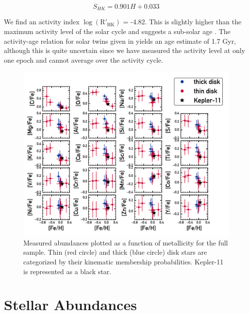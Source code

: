 \documentclass[twocolumn,trackchanges]{aastex61}
\begin{document}
\begin{equation}
S_{HK} = 0.901 H + 0.033
\end{equation}

We find an activity index $\log(\mathrm{R'_{HK}})$ = -4.82. This is slightly higher than the maximum activity level of the solar cycle and suggests a sub-solar age \citep{Skumanich1972}. The activity-age relation for solar twins given in \citet{Freitas2016} yields an age estimate of 1.7 Gyr, although this is quite uncertain since we have measured the activity level at only one epoch and cannot average over the activity cycle.

\begin{figure}
\centering
\includegraphics[scale=0.7]{xh}
\caption{Measured abundances plotted as a function of metallicity for the full sample. Thin (red circle) and thick (blue circle) disk stars are categorized by their kinematic membership probabilities. Kepler-11 is represented as a black star.}
\label{fig:xh}
\end{figure}

\section{Stellar Abundances}
\label{s:abundances}
\end{document}
